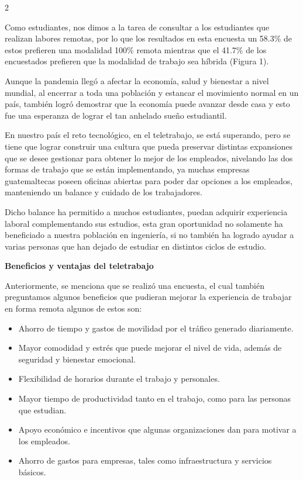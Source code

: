 \documentclass[12pt,spanish,Letterpaper,openany]{book}
\providecommand{\tightlist}{%
  \setlength{\itemsep}{0pt}\setlength{\parskip}{0pt}}
\begin{document}
\begin {multicols}{2}
\begin {flushleft}
\begin{minipage}[c]{\columnwidth}
\end{minipage}
\end {flushleft}

Como estudiantes, nos dimos a la tarea de consultar a los estudiantes que realizan labores remotas, por lo que los resultados en esta encuesta un 58.3\% de estos prefieren una modalidad 100\% remota mientras que el 41.7\% de los encuestados prefieren que la modalidad de trabajo sea híbrida (Figura 1).

Aunque la pandemia llegó a afectar la economía, salud y bienestar a nivel mundial, al encerrar a toda una población y estancar el movimiento normal en un país, también logró demostrar que la economía puede avanzar desde casa y esto fue una esperanza de lograr el tan anhelado sueño estudiantil.

En nuestro país el reto tecnológico, en el teletrabajo, se está superando, pero se tiene que lograr construir una cultura que pueda preservar distintas expansiones que se desee gestionar para obtener lo mejor de los empleados, nivelando las dos formas de trabajo que se están implementando, ya muchas empresas guatemaltecas poseen oficinas abiertas para poder dar opciones a los empleados, manteniendo un balance y cuidado de los trabajadores.

Dicho balance ha permitido a muchos estudiantes, puedan adquirir experiencia laboral complementando sus estudios, esta gran oportunidad no solamente ha beneficiado a nuestra población en ingeniería, si no también ha logrado ayudar a varias personas que han dejado de estudiar en distintos ciclos de estudio.

\textbf{Beneficios y ventajas del teletrabajo}

Anteriormente, se menciona que se realizó una encuesta, el cual también preguntamos algunos beneficios que pudieran mejorar la experiencia de trabajar en forma remota algunos de estos son:

\begin{itemize}
\tightlist
\item
  Ahorro de tiempo y gastos de movilidad por el tráfico generado diariamente.
\item
  Mayor comodidad y estrés que puede mejorar el nivel de vida, además de seguridad y bienestar emocional.
\item
  Flexibilidad de horarios durante el trabajo y personales.
\item
  Mayor tiempo de productividad tanto en el trabajo, como para las personas que estudian.
\item
  Apoyo económico e incentivos que algunas organizaciones dan para motivar a los empleados.
\item
  Ahorro de gastos para empresas, tales como infraestructura y servicios básicos.
\end{itemize}


\end{multicols}
\end{document}

